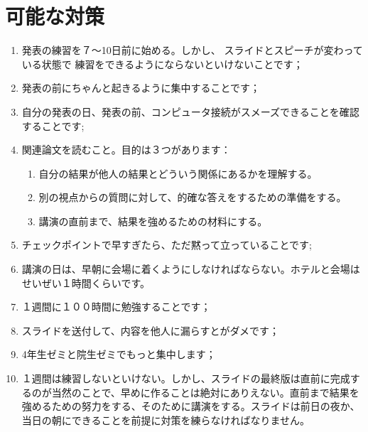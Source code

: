 \documentclass[12pt]{article} %
\theoremstyle{remark}
\begin{document}
\section{可能な対策}
\begin{enumerate}
	\item 発表の練習を７〜10日前に始める。しかし、
		スライドとスピーチが変わっている状態で
		練習をできるようにならないといけないことです；
	\item 発表の前にちゃんと起きるように集中することです；
	\item 自分の発表の日、発表の前、コンピュータ接続がスメーズできることを確認することです;
	\item 関連論文を読むこと。目的は３つがあります：\begin{enumerate}
	    	\item 自分の結果が他人の結果とどういう関係にあるかを理解する。
		\item 別の視点からの質問に対して、的確な答えをするための準備をする。
	 	\item 講演の直前まで、結果を強めるための材料にする。
		\end{enumerate}
	\item チェックポイントで早すぎたら、ただ黙って立っていることです;
	\item 講演の日は、早朝に会場に着くようにしなければならない。ホテルと会場はせいぜい１時間くらいです。
	\item １週間に１００時間に勉強することです；
	\item スライドを送付して、内容を他人に漏らすとがダメです；
	\item 4年生ゼミと院生ゼミでもっと集中します；
	\item １週間は練習しないといけない。しかし、スライドの最終版は直前に完成するのが当然のことで、早めに作ることは絶対にありえない。直前まで結果を強めるための努力をする、そのために講演をする。スライドは前日の夜か、当日の朝にできることを前提に対策を練らなければなりません。
\end{enumerate}
\end{document}
